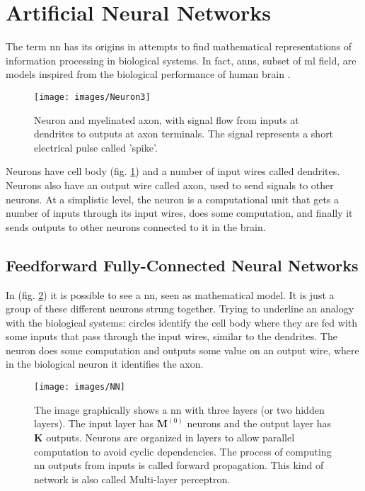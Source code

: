\newpage
\section{Artificial Neural Networks}
\label{sec:nn}
The term \gls{nn} has its origins in attempts to find mathematical representations of information processing in biological systems. In fact, \glspl{ann}, subset of \gls{ml} field, are models inspired from the biological performance of human brain \cite[]{inbook}. 

\begin{figure}[H]
	\centering
	\texttt{[image: images/Neuron3]}
	\caption[Image of a human neuron.]{Neuron and myelinated axon, with signal flow from inputs at dendrites to outputs at axon terminals. The signal represents a short electrical pulse called 'spike'.}
	\label{fig:bioneuron}
\end{figure}

\noindent Neurons have cell body (fig. \ref{fig:bioneuron}) and a number of input wires called dendrites. Neurons also have an output wire called axon, used to send signals to other neurons. At a simplistic level, the neuron is a computational unit that gets a number of inputs through its input wires, does some computation, and finally it sends outputs to other neurons connected to it in the brain. \\

\subsection{Feedforward Fully-Connected Neural Networks}
\label{nn:feedforward}

\noindent In (fig. \ref{fig:nn}) it is possible to see a \gls{nn}, seen as mathematical model. It is just a group of these different neurons strung together. Trying to underline an analogy with the biological systems: circles identify the cell body where they are fed with some inputs that pass through the input wires, similar to the dendrites. The neuron does some computation and outputs some value on an output wire, where in the biological neuron it identifies the axon.

\begin{figure}[H]
	\centering
	\texttt{[image: images/NN]}
	\caption[Feed forward neural network.]{The image graphically shows a \gls{nn} with three layers (or two hidden layers). The input layer has $\bm{M}^{(0)}$ neurons and the output layer has $\bm{K}$ outputs. Neurons are organized in  layers to allow parallel computation to avoid cyclic dependencies. The process of computing \gls{nn} outputs from inputs is called forward propagation. This kind of network is also called Multi-layer perceptron.}
	\label{fig:nn}
\end{figure}

